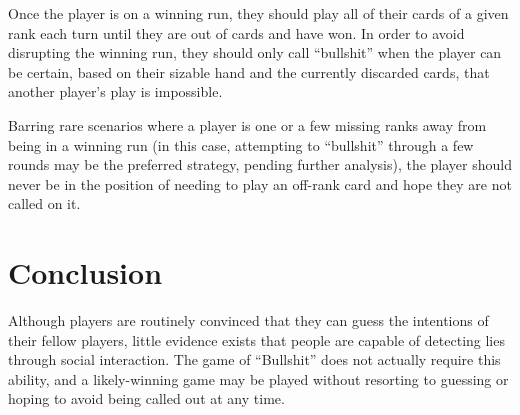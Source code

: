 \documentclass[12pt]{article}
\begin{document}
Once the player is on a winning run, they should play all of their cards of a
given rank each turn until they are out of cards and have won. In order to
avoid disrupting the winning run, they should only call ``bullshit'' when the
player can be certain, based on their sizable hand and the currently discarded
cards, that another player's play is impossible.

Barring rare scenarios where a player is one or a few missing ranks away from
being in a winning run (in this case, attempting to ``bullshit'' through a few
rounds may be the preferred strategy, pending further analysis), the player
should never be in the position of needing to play an off-rank card and hope
they are not called on it.

\section{Conclusion}
Although players are routinely convinced that they can guess the intentions of
their fellow players, little evidence exists that people are capable of detecting
lies through social interaction. The game of ``Bullshit'' does not actually require
this ability, and a likely-winning game may be played without resorting to
guessing or hoping to avoid being called out at any time.
\end{document}
